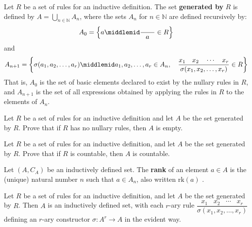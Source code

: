\begin{definition}
\label{defSetGeneratedByRules}
Let $R$ be a set of rules for an inductive definition. The set \textbf{generated by} $R$ is defined by $A = \bigcup_{n \in \mathbb{N}} A_n$, where the sets $A_n$ for $n \in \mathbb{N}$ are defined recursively by:
\[ A_0 = \left\{ a \middlemid \dfrac{\hspace{20pt}}{a} \in R \right\} \]
and
\[ A_{n+1} = \left\{ \sigma(a_1,a_2,\dots,a_r) \middlemid a_1,a_2,\dots,a_r \in A_n, \quad \dfrac{x_1 \hspace{10pt} x_2 \hspace{10pt} \cdots \hspace{10pt} x_r}{\sigma(x_1,x_2,\dots,x_r)} \in R \right\} \]
That is, $A_0$ is the set of basic elements declared to exist by the nullary rules in $R$, and $A_{n+1}$ is the set of all expressions obtained by applying the rules in $R$ to the elements of $A_n$.
\end{definition}

\todo{}

\begin{exercise}
Let $R$ be a set of rules for an inductive definition and let $A$ be the set generated by $R$. Prove that if $R$ has no nullary rules, then $A$ is empty.
\end{exercise}

\begin{exercise}
Let $R$ be a set of rules for an inductive definition, and let $A$ be the set generated by $R$. Prove that if $R$ is countable, then $A$ is countable.
\end{exercise}

\todo{}

\begin{definition}
\label{defRank}
Let $(A, C_A)$ be an inductively defined set. The \textbf{rank} of an element $a \in A$ is the (unique) natural number $n$ such that $a \in A_n$, also written $\mathrm{rk}(a)$ .
\end{definition}

\todo{}

\begin{theorem}
Let $R$ be a set of rules for an inductive definition, and let $A$ be the set generated by $R$. Then $A$ is an inductively defined set, with each $r$-ary rule $\dfrac{x_1 \hspace{10pt} x_2 \hspace{10pt} \cdots \hspace{10pt} x_r}{\sigma(x_1,x_2,\dots,x_r)}$ defining an $r$-ary constructor $\sigma : A^r \to A$ in the evident way.
\end{theorem}

